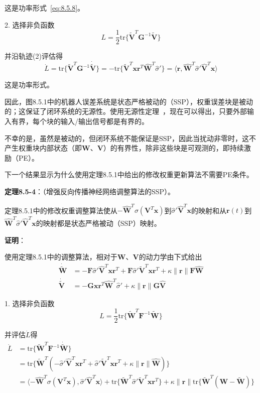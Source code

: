 \documentclass[12pt,a4paper]{ctexart}
\begin{document}
这是功率形式~\eqref{eq:8.5.8}。

2. 选择非负函数
\begin{equation}
L = \frac{1}{2}\text{tr}\{\tilde{\bm{V}}^T \bm{G}^{-1} \tilde{\bm{V}}\}
\end{equation}

并沿轨迹(2)评估得
\begin{equation}
\dot{L} = \text{tr}\{\tilde{\bm{V}}^T \bm{G}^{-1} \dot{\tilde{\bm{V}}}\} = -\text{tr}\{\tilde{\bm{V}}^T \bm{x}\bm{r}^T\hat{\bm{W}}^T\hat{\sigma}'\} = \langle \bm{r}, \hat{\bm{W}}^T\hat{\sigma}'\hat{\bm{V}}^T\bm{x} \rangle
\end{equation}

这是功率形式。

因此，图8.5.1中的机器人误差系统是状态严格被动的（SSP），权重误差块是被动的；这保证了闭环系统的无源性。使用无源性定理~\cite{slotine1991}，现在可以得出，只要外部输入有界，每个块的输入/输出信号都是有界的。

不幸的是，虽然是被动的，但闭环系统不能保证是SSP，因此当扰动非零时，这不产生权重块内部状态（即$\bm{W}$、$\bm{V}$）的有界性，除非这些块是可观测的，即持续激励（PE）。

下一个结果显示为什么使用定理8.5.1中给出的修改权重更新算法不需要PE条件。

\textbf{定理8.5-4}：（增强反向传播神经网络调整算法的SSP）。

定理8.5.1中的修改权重调整算法使从$-\hat{\bm{W}}^T\sigma(\bm{V}^T\bm{x})$到$\hat{\sigma}'\hat{\bm{V}}^T\bm{x}$的映射和从$\bm{r}(t)$到$\hat{\bm{W}}^T\hat{\sigma}'\hat{\bm{V}}^T\bm{x}$的映射都是状态严格被动（SSP）映射。

\textbf{证明}：

使用定理8.5.1中的调整算法，相对于$\bm{W}$、$\bm{V}$的动力学由下式给出
\begin{align}
\dot{\tilde{\bm{W}}} &= -\bm{F}\hat{\sigma}'\hat{\bm{V}}^T\bm{x}\bm{r}^T + \bm{F}\hat{\sigma}'\tilde{\bm{V}}^T\bm{x}\bm{r}^T + \kappa\|\bm{r}\|\bm{F}\hat{\bm{W}} \\
\dot{\tilde{\bm{V}}} &= -\bm{G}\bm{x}\bm{r}^T\hat{\bm{W}}^T\hat{\sigma}' + \kappa\|\bm{r}\|\bm{G}\hat{\bm{V}}
\end{align}

1. 选择非负函数
\begin{equation}
L = \frac{1}{2}\text{tr}\{\tilde{\bm{W}}^T \bm{F}^{-1} \tilde{\bm{W}}\}
\end{equation}

并评估$\dot{L}$得
\begin{align}
\dot{L} &= \text{tr}\{\tilde{\bm{W}}^T \bm{F}^{-1} \dot{\tilde{\bm{W}}}\} \\
&= \text{tr}\{\tilde{\bm{W}}^T(-\hat{\sigma}'\hat{\bm{V}}^T\bm{x}\bm{r}^T + \hat{\sigma}'\tilde{\bm{V}}^T\bm{x}\bm{r}^T + \kappa\|\bm{r}\|\hat{\bm{W}})\} \\
&= \langle -\hat{\bm{W}}^T\sigma(\bm{V}^T\bm{x}), \hat{\sigma}'\hat{\bm{V}}^T\bm{x} \rangle + \text{tr}\{\tilde{\bm{W}}^T\hat{\sigma}'\tilde{\bm{V}}^T\bm{x}\bm{r}^T\} + \kappa\|\bm{r}\|\text{tr}\{\tilde{\bm{W}}^T(\bm{W}-\tilde{\bm{W}})\}
\end{align}
\end{document}

